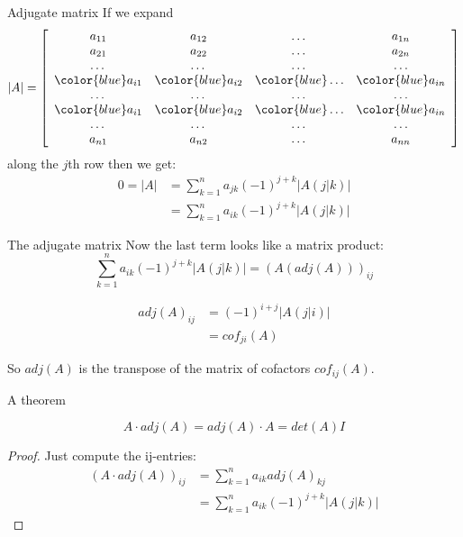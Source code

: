 \documentclass{beamer}
\begin{document}
\begin{frame}{Adjugate matrix}
  If we expand
  \begin{equation*}
    \left|A\right| = \left[
      \begin{array}{cccc}
        a_{11} & a_{12} & \dots & a_{1n}\\
        a_{21} & a_{22} & \dots & a_{2n}\\
        \dots & \dots & \dots & \dots\\
        {\color{blue}a_{i1}} & {\color{blue}a_{i2}} & {\color{blue}\dots} & {\color{blue}a_{in}}\\
        \dots & \dots & \dots & \dots\\
        {\color{blue}a_{i1}} & {\color{blue}a_{i2}} & {\color{blue}\dots}& {\color{blue}a_{in}}\\
        \dots & \dots & \dots & \dots\\
        a_{n1} & a_{n2} & \dots & a_{nn}\\
      \end{array}
    \right]
  \end{equation*}
  along the $j$th row then we get:
  \begin{align*}
    0 = \left|A\right| &= \sum_{k=1}^n a_{jk}(-1)^{j+k}\left|A(j|k)\right|\\
                   &= \sum_{k=1}^n a_{ik}(-1)^{j+k}\left|A(j|k)\right|
  \end{align*}
\end{frame}

\begin{frame}{The adjugate matrix}
  Now the last term looks like a matrix product:
  \begin{equation*}
    \sum_{k=1}^n a_{ik}(-1)^{j+k}\left|A(j|k)\right| = (A(adj (A)))_{ij}
  \end{equation*}
  \begin{definition}
    \begin{align*}
      adj (A)_{ij} &= (-1)^{i+j}\left|A(j|i)\right|\\
                   &= cof_{ji}(A)
    \end{align*}
  \end{definition}
  So $adj(A)$ is the transpose of the matrix of cofactors $cof_{ij}(A)$.
\end{frame}

\begin{frame}{A theorem}
  \begin{theorem}
    \begin{equation*}
      A\cdot adj(A) = adj(A)\cdot A = det(A) I
    \end{equation*}
    \begin{proof}
      Just compute the ij-entries:
      \begin{align*}
        (A\cdot adj(A))_{ij} &= \sum_{k=1}^n a_{ik}adj(A)_{kj}\\
                             &= \sum_{k=1}^n a_{ik}(-1)^{j+k}\left|A(j|k)\right|
      \end{align*}
    \end{proof}
  \end{theorem}
\end{frame}
\end{document}
